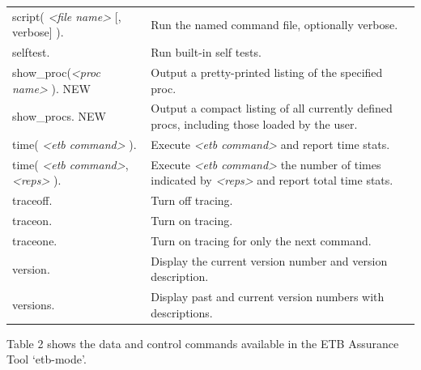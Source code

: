 \documentclass[12pt,twoside,a4paper]{article}
\begin{document}
\begin{longtable}[]{@{}
  >{\raggedright\arraybackslash}p{}
  >{\raggedright\arraybackslash}p{}@{}}
script( \emph{\textless file name\textgreater{}} {[}, verbose{]} ). & Run the named command file, optionally verbose. \\
selftest. & Run built-in self tests. \\
show\_proc(\emph{\textless proc name\textgreater{}} ). NEW & Output a pretty-printed listing of the specified proc. \\
show\_procs. NEW & Output a compact listing of all currently defined procs, including those loaded by the user. \\
time( \emph{\textless etb command\textgreater{}} ). & Execute \emph{\textless etb command\textgreater{}} and report time stats. \\
time( \emph{\textless etb command\textgreater{}}, \emph{\textless reps\textgreater{}} ). & Execute \emph{\textless etb command\textgreater{}} the number of times indicated by \emph{\textless reps\textgreater{}} and report total time stats. \\
traceoff. & Turn off tracing. \\
traceon. & Turn on tracing. \\
traceone. & Turn on tracing for only the next command. \\
version. & Display the current version number and version description. \\
versions. & Display past and current version numbers with descriptions. \\
\bottomrule
\end{longtable}

Table 2 shows the data and control commands available in the ETB Assurance Tool `etb-mode'.
\end{document}
